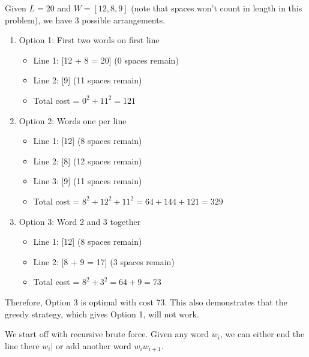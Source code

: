 \documentclass{article}
\begin{document}
    \begin{example}
      Given $L = 20$ and $W = [12, 8, 9]$ (note that spaces won't count in length in this problem), we have 3 possible arrangements. 
      \begin{enumerate}
        \item Option 1: First two words on first line
        \begin{itemize}
          \item Line 1: [12 + 8 = 20] (0 spaces remain)
          \item Line 2: [9] (11 spaces remain)
          \item Total cost = $0^2 + 11^2 = 121$
        \end{itemize}

        \item Option 2: Words one per line
        \begin{itemize}
          \item Line 1: [12] (8 spaces remain)
          \item Line 2: [8] (12 spaces remain)
          \item Line 3: [9] (11 spaces remain)
          \item Total cost = $8^2 + 12^2 + 11^2 = 64 + 144 + 121 = 329$
        \end{itemize}

        \item Option 3: Word 2 and 3 together
        \begin{itemize}
          \item Line 1: [12] (8 spaces remain)
          \item Line 2: [8 + 9 = 17] (3 spaces remain)
          \item Total cost = $8^2 + 3^2 = 64 + 9 = 73$
        \end{itemize}
      \end{enumerate}
      Therefore, Option 3 is optimal with cost 73. This also demonstrates that the greedy strategy, which gives Option 1, will not work. 
    \end{example}

    We start off with recursive brute force. Given any word $w_i$, we can either end the line there $w_i |$ or add another word $w_i w_{i+1}$. 
\end{document}
